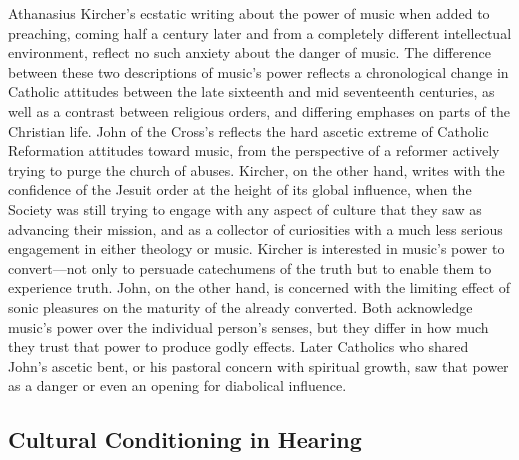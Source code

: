 Athanasius Kircher's ecstatic writing about the power of music when added to
preaching, coming half a century later and from a completely different
intellectual environment, reflect no such anxiety about the danger of music.
The difference between these two descriptions of music's power reflects a
chronological change in Catholic attitudes between the late sixteenth and mid
seventeenth centuries, as well as a contrast between religious orders, and
differing emphases on parts of the Christian life.
John of the Cross's reflects the hard ascetic extreme of Catholic Reformation
attitudes toward music, from the perspective of a reformer actively trying to
purge the church of abuses.
Kircher, on the other hand, writes with the confidence of the Jesuit order at
the height of its global influence, when the Society was still trying to engage
with any aspect of culture that they saw as advancing their mission, and as a
collector of curiosities with a much less serious engagement in either theology
or music.
Kircher is interested in music's power to convert---not only to persuade
catechumens of the truth but to enable them to experience truth.
John, on the other hand, is concerned with the limiting effect of sonic
pleasures on the maturity of the already converted.
Both acknowledge music's power over the individual person's senses, but they
differ in how much they trust that power to produce godly effects.
Later Catholics who shared John's ascetic bent, or his pastoral concern with
spiritual growth, saw that power as a danger or even an opening for diabolical
influence.


\subsection{Cultural Conditioning in Hearing}

